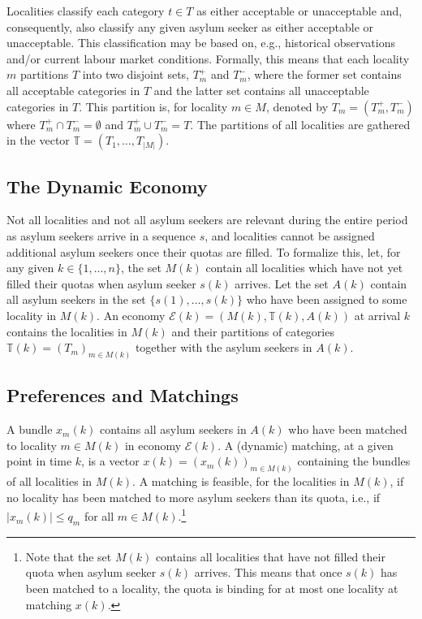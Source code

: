 \documentclass[12pt,fleqn]{article}
\begin{document}
Localities classify each category $t\in T$ as either acceptable or unacceptable and, consequently, also classify any given asylum seeker as either acceptable or unacceptable. This classification may be based on, e.g., historical observations and/or current labour market conditions. Formally, this means that each locality $m$ partitions $T$ into two disjoint sets, $T^+_m$ and $T_m^-$, where the former set contains all acceptable categories in $T$ and the latter set contains all unacceptable categories in $T$. This partition is, for locality $m\in M$, denoted by $T_m=(T^+_m, T_m^-)$ where $T^+_m\cap T_m^-=\emptyset$ and $T^+_m\cup T_m^-=T$. The partitions of all localities are gathered in the vector $\mathbb{T}=(T_1,\ldots,T_{|M|})$.

\subsection{The Dynamic Economy}
Not all localities and not all asylum seekers are relevant during the entire period as asylum seekers arrive in a sequence $s$, and localities cannot be assigned additional asylum seekers once their quotas are filled. To formalize this, let, for any given $k\in \{1,\ldots,n\}$, the set $M(k)$ contain all localities which have not yet filled their quotas when asylum seeker $s(k)$ arrives. Let the set $A(k)$ contain all asylum seekers in the set $\{s(1),\ldots,s(k)\}$ who have been assigned to some locality in $M(k)$. An economy $\mathcal{E}(k)=(M(k),\mathbb{T}(k),A(k))$ at arrival $k$ contains the localities in $M(k)$ and their partitions of categories $\mathbb{T}(k)=(T_m)_{m\in M(k)}$ together with the asylum seekers in $A(k)$.

\subsection{Preferences and Matchings}
A bundle $x_m(k)$ contains all asylum seekers in $A(k)$ who have been matched to locality $m\in M(k)$ in economy $\mathcal{E}(k)$. A (dynamic) matching, at a given point in time $k$, is a vector $x(k)=(x_m(k))_{m\in M(k)}$ containing the bundles of all localities in $M(k)$. A matching is feasible, for the localities in $M(k)$, if no locality has been matched to more asylum seekers than its quota, i.e., if $|x_m(k)|\leq q_m$ for all $m\in M(k)$.\footnote{Note that the set $M(k)$ contains all localities that have not filled their quota when asylum seeker $s(k)$ arrives. This means that once $s(k)$ has been matched to a locality, the quota is binding for at most one locality at matching $x(k)$.}
\end{document}
